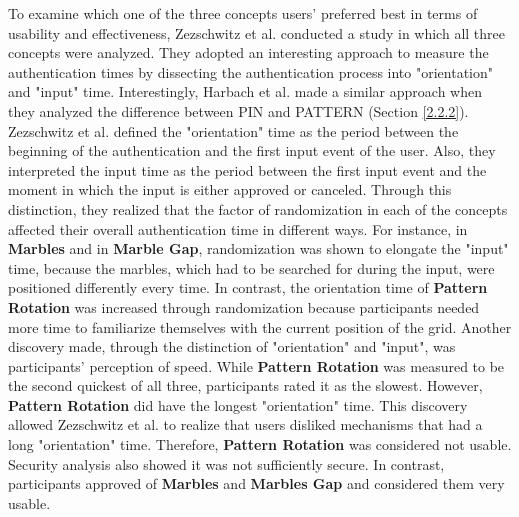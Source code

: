 To examine which one of the three concepts users' preferred best in terms of usability and effectiveness, Zezschwitz et al. \cite{Marbles} conducted a study in which all three concepts were analyzed. They adopted an interesting approach to measure the authentication times by dissecting the authentication process into "orientation" and "input" time. Interestingly, Harbach et al. \cite{AnatomySmartphone} made a similar approach when they analyzed the difference between PIN and PATTERN (Section \ref{2.2.2}). Zezschwitz et al. \cite{Marbles} defined the "orientation" time as the period between the beginning of the authentication and the first input event of the user. Also, they interpreted the input time as the period between the first input event and the moment in which the input is either approved or canceled. Through this distinction, they realized that the factor of randomization in each of the concepts affected their overall authentication time in different ways. For instance, in \textbf{Marbles} and in \textbf{Marble Gap}, randomization was shown to elongate the "input" time, because the marbles, which had to be searched for during the input, were positioned differently every time. In contrast, the orientation time of \textbf{Pattern Rotation} was increased through randomization because participants needed more time to familiarize themselves with the current position of the grid. Another discovery made, through the distinction of "orientation" and "input", was participants' perception of speed. While \textbf{Pattern Rotation} was measured to be the second quickest of all three, participants rated it as the slowest. However, \textbf{Pattern Rotation} did have the longest "orientation" time. This discovery allowed Zezschwitz et al. \cite{Marbles} to realize that users disliked mechanisms that had a long "orientation" time. Therefore, \textbf{Pattern Rotation} was considered not usable. Security analysis also showed it was not sufficiently secure. In contrast, participants approved of \textbf{Marbles} and \textbf{Marbles Gap} and considered them very usable.\\


